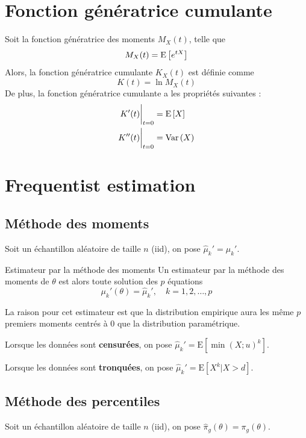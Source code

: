 \documentclass[10pt, french]{article}
\begin{document}
\begin{multicols*}{3}
\setcounter{section}{8}

\section{Fonction génératrice cumulante}
Soit la fonction génératrice des moments $M_X(t)$, telle que
\[M_X(t) = \mathrm{E} \left[ e^{tX} \right]\]
Alors, la fonction génératrice cumulante $K_X(t)$ est définie comme
\[K(t) = \ln M_X(t)\]
De plus, la fonction génératrice cumulante a les propriétés suivantes : 
\begin{align*}
K'(t) \biggr \rvert_{t = 0} & =   \mathrm{E} \left[ X \right] \\
K''(t) \biggr \rvert_{t=0} & = \mathrm{Var} \left( X \right) \\
\end{align*}

\setcounter{section}{9}
\section{Frequentist estimation}
\subsection*{Méthode des moments}

Soit un échantillon aléatoire de taille $n$ (iid), on pose $\hat\mu_{k}' = \mu_{k}'$.

\begin{algo}{Estimateur par la méthode des moments}
Un estimateur par la méthode des moments de $\theta$ est alors toute solution des $p$ équations
\begin{equation*}
	\mu_{k}'(\theta) = \hat\mu_{k}', \quad	k = 1, 2, \dots, p
\end{equation*}
\end{algo}

La raison pour cet estimateur est que la distribution empirique aura les même $p$ premiers moments centrés à 0 que la distribution paramétrique.
 

Lorsque les données sont \textbf{censurées}, on pose $\hat\mu_{k}' = \text{E}[\min(X; u)^{k}]$.

Lorsque les données sont \textbf{tronquées}, on pose $\hat\mu_{k}' = \text{E}[X^{k} | X > d]$.


\subsection*{Méthode des percentiles}


Soit un échantillon aléatoire de taille $n$ (iid), on pose $\hat\pi_{g}(\theta) = \pi_{g}(\theta)$.


\end{multicols*}
\end{document}
